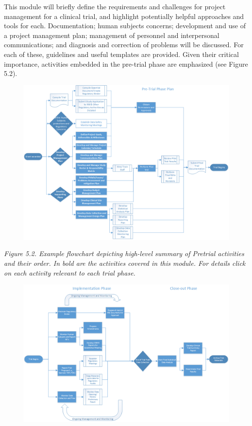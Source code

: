 \documentclass[]{book}
\theoremstyle{definition}
\theoremstyle{definition}
\theoremstyle{definition}
\theoremstyle{remark}
\begin{document}
This module will briefly define the requirements and challenges for
project management for a clinical trial, and highlight potentially
helpful approaches and tools for each. Documentation; human subjects
concerns; development and use of a project management plan; management
of personnel and interpersonal communications; and diagnosis and
correction of problems will be discussed. For each of these, guidelines
and useful templates are provided. Given their critical importance,
activities embedded in the pre-trial phase are emphasized (see Figure
5.2).

\begin{figure}
\centering
\includegraphics{images/book/pm2.png}
\caption{}
\end{figure}

\emph{Figure 5.2. Example flowchart depicting high-level summary of
Pretrial activities and their order. In bold are the activities covered
in this module. For details click on each activity relevant to each
trial phase. }

\begin{figure}
\centering
\includegraphics{images/book/pm3.png}
\caption{}
\end{figure}
\end{document}
